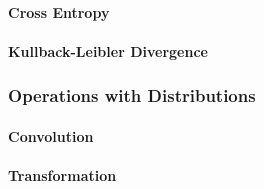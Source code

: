 \paragraph{Cross Entropy}


\paragraph{Kullback-Leibler Divergence}



\subsubsection{Operations with Distributions}

\paragraph{Convolution}


\paragraph{Transformation}




